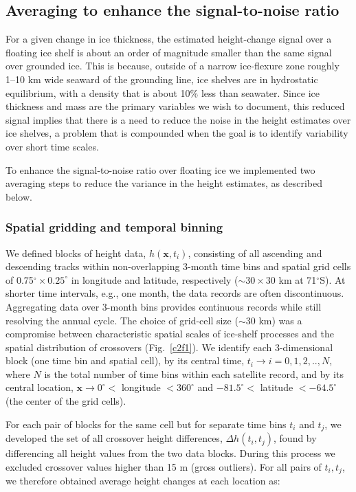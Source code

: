 \subsection{Averaging to enhance the signal-to-noise ratio}
\label{sec:ra-analysis}

For a given change in ice thickness, the estimated height-change signal over a floating ice shelf is about an order of magnitude smaller than the same signal over grounded ice. This is because, outside of a narrow ice-flexure zone roughly 1--10 km wide seaward of the grounding line, ice shelves are in hydrostatic equilibrium, with a density that is about 10\% less than seawater. Since ice thickness and mass are the primary variables we wish to document, this reduced signal implies that there is a need to reduce the noise in the height estimates over ice shelves, a problem that is compounded when the goal is to identify variability over short time scales.

To enhance the signal-to-noise ratio over floating ice we implemented two averaging steps to reduce the variance in the height estimates, as described below.

\subsubsection{Spatial gridding and temporal binning}

We defined blocks of height data, $h(\mathbf{x},t_i)$, consisting of all ascending and descending tracks within non-overlapping 3-month time bins and spatial grid cells of 0.75$^\circ \times 0.25^\circ$ in longitude and latitude, respectively ($\sim30 \times 30$ km at 71$^\circ$S). At shorter time intervals, e.g., one month, the data records are often discontinuous. Aggregating data over 3-month bins provides continuous records while still resolving the annual cycle. The choice of grid-cell size ($\sim$30 km) was a compromise between characteristic spatial scales of ice-shelf processes and the spatial distribution of crossovers (Fig.~\ref{c2f1}). We identify each 3-dimensional block (one time bin and spatial cell), by its central time, $t_i \rightarrow i=0,1,2,..,N$, where $N$ is the total number of time bins within each satellite record, and by its central location, $\mathbf x \rightarrow 0^\circ <$ longitude $< 360^\circ$ and $-81.5^\circ <$ latitude $< -64.5^\circ$ (the center of the grid cells).

For each pair of blocks for the same cell but for separate time bins $t_i$ and $t_j$, we developed the set of all crossover height differences, ${\Delta h(t_i,t_j)}$, found by differencing all height values from the two data blocks. During this process we excluded crossover values higher than 15 m (gross outliers). For all pairs of ${t_i,t_j}$, we therefore obtained average height changes at each location as:

